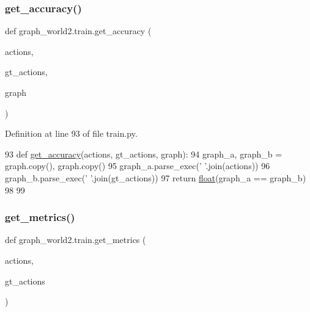 \mbox{\label{namespacegraph__world2_1_1train_a8bb8c5ab11be91db36eb268e1c2088a8}} 
\subsubsection{\texorpdfstring{get\+\_\+accuracy()}{get\_accuracy()}}
{\footnotesize\ttfamily def graph\+\_\+world2.\+train.\+get\+\_\+accuracy (\begin{DoxyParamCaption}\item[{}]{actions,  }\item[{}]{gt\+\_\+actions,  }\item[{}]{graph }\end{DoxyParamCaption})}



Definition at line 93 of file train.\+py.


\begin{DoxyCode}
93 \textcolor{keyword}{def }\hyperlink{namespacegraph__world2_1_1train_a8bb8c5ab11be91db36eb268e1c2088a8}{get\_accuracy}(actions, gt\_actions, graph):
94     graph\_a, graph\_b = graph.copy(), graph.copy()
95     graph\_a.parse\_exec(\textcolor{stringliteral}{' '}.join(actions))
96     graph\_b.parse\_exec(\textcolor{stringliteral}{' '}.join(gt\_actions))
97     \textcolor{keywordflow}{return} \hyperlink{namespacegraph__world2_1_1train_a9843eaa25215aba91f3f4b223dbb2049}{float}(graph\_a == graph\_b)
98 
99 
\end{DoxyCode}
\mbox{\label{namespacegraph__world2_1_1train_ab3ba8ae63848a00ac638b31329041f6b}} 
\subsubsection{\texorpdfstring{get\+\_\+metrics()}{get\_metrics()}}
{\footnotesize\ttfamily def graph\+\_\+world2.\+train.\+get\+\_\+metrics (\begin{DoxyParamCaption}\item[{}]{actions,  }\item[{}]{gt\+\_\+actions }\end{DoxyParamCaption})}



